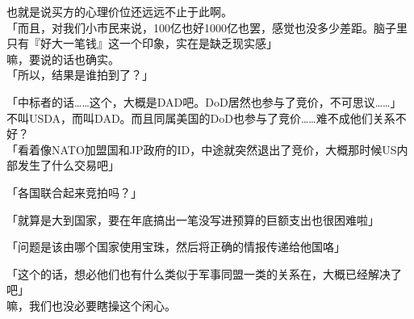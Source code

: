 也就是说买方的心理价位还远远不止于此啊。\\

「而且，对我们小市民来说，100亿也好1000亿也罢，感觉也没多少差距。脑子里只有『好大一笔钱』这一个印象，实在是缺乏现实感」\\

嘛，要说的话也确实。\\

「所以，结果是谁拍到了？」

「中标者的话……这个，大概是DAD吧。DoD居然也参与了竞价，不可思议……」\\

不叫USDA，而叫DAD。而且同属美国的DoD也参与了竞价……难不成他们关系不好？\\

「看着像NATO加盟国和JP政府的ID，中途就突然退出了竞价，大概那时候US内部发生了什么交易吧」

「各国联合起来竞拍吗？」

「就算是大到国家，要在年底搞出一笔没写进预算的巨额支出也很困难啦」

「问题是该由哪个国家使用宝珠，然后将正确的情报传递给他国咯」

「这个的话，想必他们也有什么类似于军事同盟一类的关系在，大概已经解决了吧」\\

嘛，我们也没必要瞎操这个闲心。

